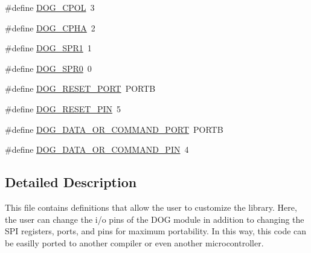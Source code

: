 \begin{DoxyCompactItemize}
\#define \hyperlink{group___d_o_g_m128__user__configuration_gaa5a26b17ebd077ec4bb2fac855265581}{D\-O\-G\-\_\-\-C\-P\-O\-L}~3
\item 
\#define \hyperlink{group___d_o_g_m128__user__configuration_ga73929d65cab96386dbcda9b96e896cda}{D\-O\-G\-\_\-\-C\-P\-H\-A}~2
\item 
\#define \hyperlink{group___d_o_g_m128__user__configuration_ga5e847553b02a6edd3d79d83b3b5bfb63}{D\-O\-G\-\_\-\-S\-P\-R1}~1
\item 
\#define \hyperlink{group___d_o_g_m128__user__configuration_ga5b3f5b6050798cb4e898420cca291231}{D\-O\-G\-\_\-\-S\-P\-R0}~0
\item 
\#define \hyperlink{group___d_o_g_m128__user__configuration_gadcdcd4600395a1e3f2fb35ecb2b3d929}{D\-O\-G\-\_\-\-R\-E\-S\-E\-T\-\_\-\-P\-O\-R\-T}~P\-O\-R\-T\-B
\item 
\#define \hyperlink{group___d_o_g_m128__user__configuration_gab6cbac4e4756ac898479caef5b76cd29}{D\-O\-G\-\_\-\-R\-E\-S\-E\-T\-\_\-\-P\-I\-N}~5
\item 
\#define \hyperlink{group___d_o_g_m128__user__configuration_ga7a79d5d66a25812afb30f2524490af3e}{D\-O\-G\-\_\-\-D\-A\-T\-A\-\_\-\-O\-R\-\_\-\-C\-O\-M\-M\-A\-N\-D\-\_\-\-P\-O\-R\-T}~P\-O\-R\-T\-B
\item 
\#define \hyperlink{group___d_o_g_m128__user__configuration_ga49fc845183d9cc067238f3b6d26a0a9b}{D\-O\-G\-\_\-\-D\-A\-T\-A\-\_\-\-O\-R\-\_\-\-C\-O\-M\-M\-A\-N\-D\-\_\-\-P\-I\-N}~4
\end{DoxyCompactItemize}


\subsection{Detailed Description}
This file contains definitions that allow the user to customize the library. Here, the user can change the i/o pins of the D\-O\-G module in addition to changing the S\-P\-I registers, ports, and pins for maximum portability. In this way, this code can be easilly ported to another compiler or even another microcontroller. 

